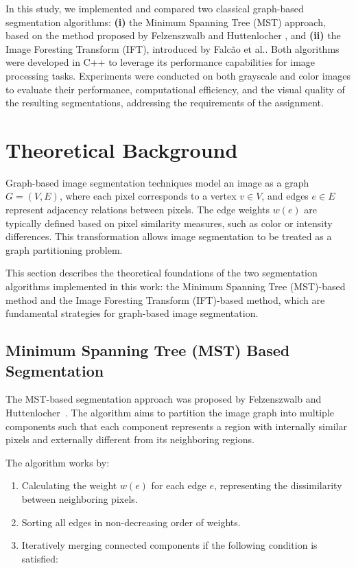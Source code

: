 \documentclass{sbc2023}
\begin{document}
In this study, we implemented and compared two classical graph-based segmentation algorithms: \textbf{(i)} the Minimum Spanning Tree (MST) approach, based on the method proposed by Felzenszwalb and Huttenlocher , and \textbf{(ii)} the Image Foresting Transform (IFT), introduced by Falcão et al.. Both algorithms were developed in C++  to leverage its performance capabilities for image processing tasks. Experiments were conducted on both grayscale and color images to evaluate their performance, computational efficiency, and the visual quality of the resulting segmentations, addressing the requirements of the assignment.

\section{Theoretical Background}
\label{sec:background}

Graph-based image segmentation techniques model an image as a graph \( G = (V, E) \), where each pixel corresponds to a vertex \( v \in V \), and edges \( e \in E \) represent adjacency relations between pixels. The edge weights \( w(e) \) are typically defined based on pixel similarity measures, such as color or intensity differences. This transformation allows image segmentation to be treated as a graph partitioning problem.

This section describes the theoretical foundations of the two segmentation algorithms implemented in this work: the Minimum Spanning Tree (MST)-based method and the Image Foresting Transform (IFT)-based method, which are fundamental strategies for graph-based image segmentation.


\subsection{Minimum Spanning Tree (MST) Based Segmentation}

The MST-based segmentation approach was proposed by Felzenszwalb and Huttenlocher~\cite{felzenszwalb2004efficient}. The algorithm aims to partition the image graph into multiple components such that each component represents a region with internally similar pixels and externally different from its neighboring regions.

The algorithm works by:

\begin{enumerate}
    \item Calculating the weight \( w(e) \) for each edge \( e \), representing the dissimilarity between neighboring pixels.
    \item Sorting all edges in non-decreasing order of weights.
    \item Iteratively merging connected components if the following condition is satisfied:
\end{enumerate}
\end{document}
